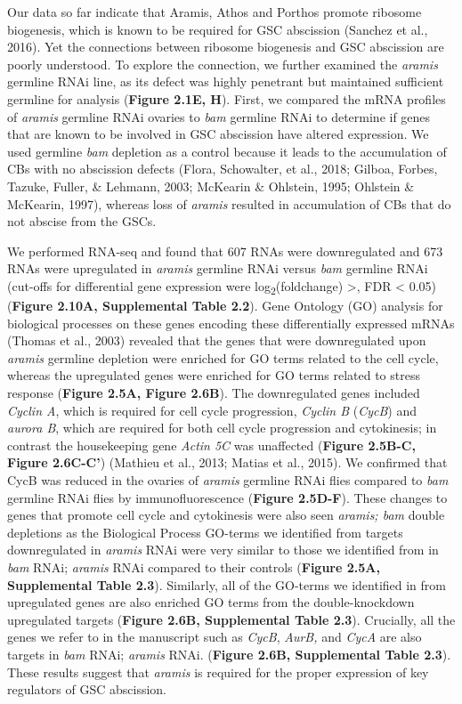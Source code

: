\documentclass[12pt,oneside]{reedthesis}
\begin{document}
Our data so far indicate that Aramis, Athos and Porthos promote ribosome
biogenesis, which is known to be required for GSC abscission
(Sanchez et al., 2016). Yet the connections between ribosome biogenesis and
GSC abscission are poorly understood. To explore the connection, we
further examined the \emph{aramis} germline RNAi line, as its defect was
highly penetrant but maintained sufficient germline for analysis
(\textbf{Figure 2.1E, H}). First, we compared the mRNA profiles of \emph{aramis}
germline RNAi ovaries to \emph{bam} germline RNAi to determine if genes that
are known to be involved in GSC abscission have altered expression. We
used germline \emph{bam} depletion as a control because it leads to the
accumulation of CBs with no abscission defects (Flora, Schowalter, et al., 2018; Gilboa, Forbes, Tazuke, Fuller, \& Lehmann, 2003; McKearin \& Ohlstein, 1995; Ohlstein \& McKearin, 1997), whereas loss of \emph{aramis}
resulted in accumulation of CBs that do not abscise from the GSCs.

We performed RNA-seq and found that 607 RNAs were downregulated and 673
RNAs were upregulated in \emph{aramis} germline RNAi versus \emph{bam} germline
RNAi (cut-offs for differential gene expression were log\textsubscript{2}(foldchange)
\textgreater{}\textbar, FDR \textless{} 0.05) (\textbf{Figure 2.10A, Supplemental Table 2.2}). Gene
Ontology (GO) analysis for biological processes on these genes encoding
these differentially expressed mRNAs
(Thomas et al., 2003) revealed that the genes that were
downregulated upon \emph{aramis} germline depletion were enriched for GO
terms related to the cell cycle, whereas the upregulated genes were
enriched for GO terms related to stress response (\textbf{Figure 2.5A, Figure 2.6B}). The downregulated genes included \emph{Cyclin A}, which is required
for cell cycle progression, \emph{Cyclin B} (\emph{CycB}) and \emph{aurora B}, which
are required for both cell cycle progression and cytokinesis; in
contrast the housekeeping gene \emph{Actin 5C} was unaffected (\textbf{Figure 2.5B-C, Figure 2.6C-C'}) (Mathieu et al., 2013; Matias et al., 2015). We confirmed that
CycB was reduced in the ovaries of \emph{aramis} germline RNAi flies compared
to \emph{bam} germline RNAi flies by immunofluorescence (\textbf{Figure 2.5D-F}).
These changes to genes that promote cell cycle and cytokinesis were also
seen \emph{aramis; bam} double depletions as the Biological Process GO-terms
we identified from targets downregulated in \emph{aramis} RNAi were very
similar to those we identified from in \emph{bam} RNAi; \emph{aramis} RNAi
compared to their controls (\textbf{Figure 2.5A, Supplemental Table 2.3}). Similarly,
all of the GO-terms we identified in from upregulated genes are also
enriched GO terms from the double-knockdown upregulated targets (\textbf{Figure 2.6B, Supplemental Table 2.3}).
Crucially, all the genes we refer to in the
manuscript such as \emph{CycB}, \emph{AurB,} and \emph{CycA} are also targets in \emph{bam}
RNAi; \emph{aramis} RNAi. (\textbf{Figure 2.6B, Supplemental Table 2.3}). These
results suggest that \emph{aramis} is required for the proper expression of
key regulators of GSC abscission.
\end{document}
